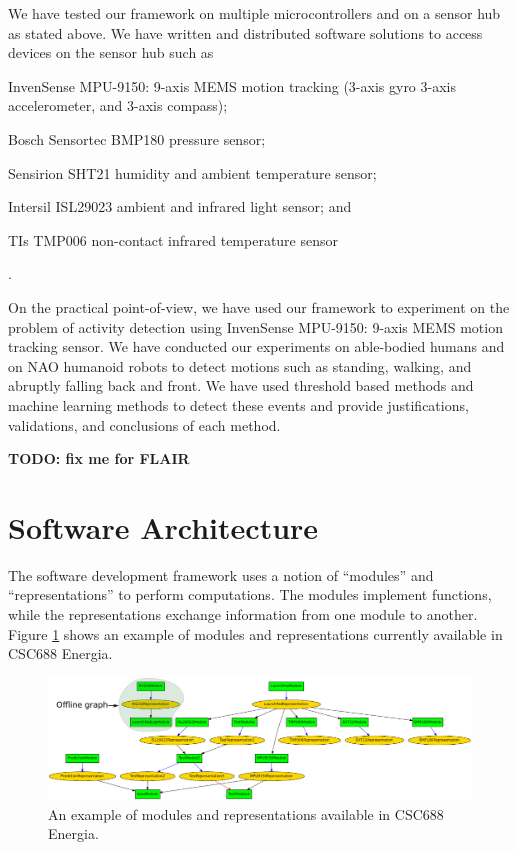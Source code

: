 \documentclass[letterpaper]{article}
\begin{document}
We have tested our framework on multiple microcontrollers and on a sensor hub as stated above. We
have written and distributed software solutions to access devices on the sensor hub such as
\begin{inparaenum}[(1)] \item InvenSense MPU-9150: 9-axis MEMS motion tracking (3-axis gyro
3-axis accelerometer, and 3-axis compass); \item Bosch Sensortec BMP180 pressure sensor; \item
Sensirion SHT21 humidity and ambient temperature sensor; \item Intersil ISL29023 ambient and
infrared light sensor; and \item TIs TMP006 non-contact infrared temperature sensor\end{inparaenum}.

On the practical point-of-view, we have used our framework to experiment on the problem of activity
detection using InvenSense MPU-9150: 9-axis MEMS motion tracking sensor. We have conducted our
experiments on able-bodied humans and on NAO humanoid robots to detect motions such as standing,
walking, and abruptly falling back and front. We have used threshold based methods and machine
learning methods to detect these events and provide justifications, validations, and conclusions of
each method.  

\textbf{TODO: fix me for FLAIR}



\section{Software Architecture}

The software development framework uses a notion of ``modules'' and ``representations'' to perform
computations. The modules implement functions, while the representations exchange information from
one module to another. Figure \ref{fig:framework} shows an example of modules and representations
currently available in CSC688 Energia.

\begin{figure}[!t]
\centering
 \includegraphics[width=1.0\textwidth] {framework}
 \caption{An example of modules and representations available in CSC688 Energia.}
 \label{fig:framework}
\end{figure}
\end{document}
